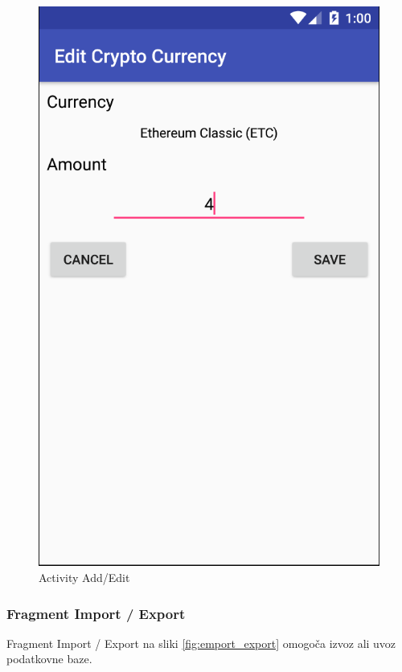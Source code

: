 \documentclass[11pt,a4paper]{article}
\begin{document}
\begin{figure}[htb]
	\begin{center}
		\includegraphics[width=0.8\columnwidth]{edit.png}
	\end{center}
	\caption{Activity Add/Edit}
	\label{fig:edit}
\end{figure}

\subsubsection{Fragment Import / Export}
Fragment Import / Export na sliki \ref{fig:emport_export} omogoča izvoz ali uvoz podatkovne baze.
\end{document}

